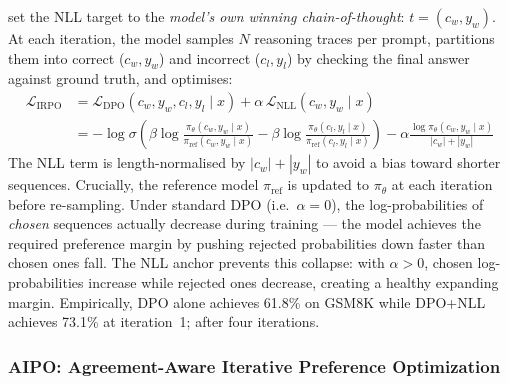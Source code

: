 \autocite{pang2024iterativereasoningpreferenceoptimization} set the NLL target to the \textit{model's own winning chain-of-thought}: $t = (c_w, y_w)$. At each iteration, the model samples $N$ reasoning traces per prompt, partitions them into correct ($c_w, y_w$) and incorrect ($c_l, y_l$) by checking the final answer against ground truth, and optimises:
\begin{align}
    \mathcal{L}_{\text{IRPO}} & = \mathcal{L}_{\text{DPO}}(c_w, y_w, c_l, y_l \mid x) + \alpha\,\mathcal{L}_{\text{NLL}}(c_w, y_w \mid x) \nonumber                                                                                                                                              \\
                              & = -\log \sigma\!\left(\beta \log \frac{\pi_\theta(c_w, y_w \mid x)}{\pi_{\text{ref}}(c_w, y_w \mid x)} - \beta \log \frac{\pi_\theta(c_l, y_l \mid x)}{\pi_{\text{ref}}(c_l, y_l \mid x)}\right) - \alpha \frac{\log \pi_\theta(c_w, y_w \mid x)}{|c_w| + |y_w|}
    \label{eq:irpo}
\end{align}
The NLL term is length-normalised by $|c_w| + |y_w|$ to avoid a bias toward shorter sequences. Crucially, the reference model $\pi_{\text{ref}}$ is updated to $\pi_\theta$ at each iteration before re-sampling. Under standard DPO (i.e.\ $\alpha = 0$), the log-probabilities of \emph{chosen} sequences actually decrease during training --- the model achieves the required preference margin by pushing rejected probabilities down faster than chosen ones fall. The NLL anchor prevents this collapse: with $\alpha > 0$, chosen log-probabilities increase while rejected ones decrease, creating a healthy expanding margin. Empirically, DPO alone achieves 61.8\% on GSM8K while DPO+NLL achieves 73.1\% at iteration~1; after four iterations.

\subsubsection{AIPO: Agreement-Aware Iterative Preference Optimization}
\label{sec:aipo}

